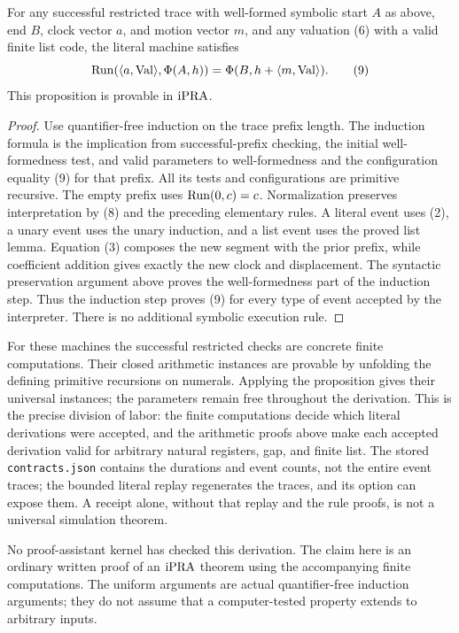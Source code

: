 \begin{proposition}
For any successful restricted trace with well-formed symbolic start $A$
as above, end $B$, clock vector $a$, and motion vector $m$, and any
valuation (6) with a valid finite list code, the literal machine satisfies
\[
 \operatorname{Run}(\langle a,\operatorname{Val}\rangle,\Phi(A,h))
   =\Phi(B,h+\langle m,\operatorname{Val}\rangle).                             \tag{9}
\]
This proposition is provable in $\mathrm{iPRA}$.
\end{proposition}

\begin{proof}
Use quantifier-free induction on the trace prefix length.  The induction
formula is the implication from successful-prefix checking, the initial
well-formedness test, and valid parameters to well-formedness and the
configuration equality (9) for that prefix.  All its tests and
configurations are primitive recursive.  The empty prefix
uses $\operatorname{Run}(0,c)=c$.  Normalization preserves interpretation by (8) and
the preceding elementary rules.  A literal event uses (2), a unary event
uses the unary induction, and a list event uses the proved list lemma.
Equation (3) composes the new segment with the prior prefix, while
coefficient addition gives exactly the new clock and displacement.
The syntactic preservation argument above proves the well-formedness
part of the induction step.
Thus the induction step proves (9) for every type of event accepted by
the interpreter.  There is no additional symbolic execution rule.
\end{proof}

For these machines the successful restricted checks are concrete finite
computations.  Their closed arithmetic instances are provable by
unfolding the defining primitive recursions on numerals.  Applying the
proposition gives their universal instances; the parameters remain free
throughout the derivation.  This is the precise division of labor:
the finite computations decide which literal derivations were accepted,
and the arithmetic proofs above make each accepted derivation valid for
arbitrary natural registers, gap, and finite list.  The stored
\texttt{contracts.json} contains the durations and event counts, not
the entire event traces; the bounded literal replay regenerates the
traces, and its  option can expose them.  A receipt
alone, without that replay and the rule proofs, is not a universal
simulation theorem.

No proof-assistant kernel has checked this derivation.  The claim here
is an ordinary written proof of an $\mathrm{iPRA}$ theorem using the accompanying
finite computations.  The uniform arguments are actual quantifier-free
induction arguments; they do not assume that a computer-tested property
extends to arbitrary inputs.

